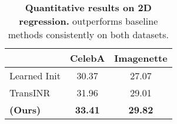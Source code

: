 \begin{table}[t]
    \centering
    \caption{\textbf{Quantitative results on 2D regression.} \name{} outperforms baseline methods consistently on both datasets.}
    \label{tab:image-regression}
    \begin{tabular}{lcc}
        \toprule
                 & CelebA & Imagenette \\ \midrule
        Learned Init \citep{tancik2021learned} & 30.37  & 27.07       \\
        TransINR~\citep{chen2022transformers}  & 31.96  & 29.01       \\ 
        \rowcolor{lightblue}
        \textbf{\name{} (Ours)}         & \textbf{33.41}  & \textbf{29.82}      \\ 
        \bottomrule
    \end{tabular}
\end{table}